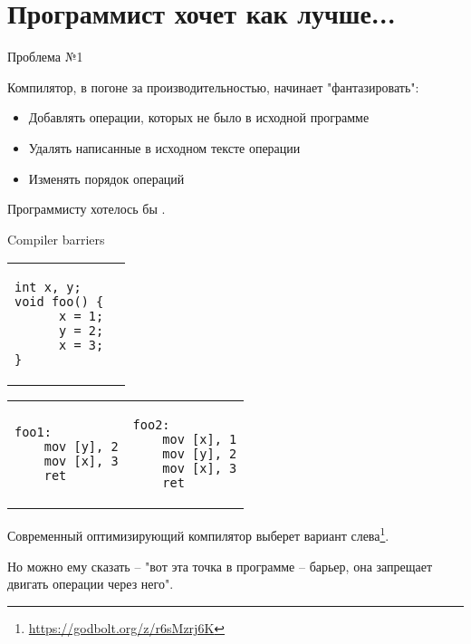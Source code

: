 
\section{Программист хочет как лучше...}
\showTOC

\begin{frame}[t]{Проблема №1}

Компилятор, в погоне за производительностью, начинает "фантазировать":
\begin{itemize}
	\pause
	\item Добавлять операции, которых не было в исходной программе
	\item Удалять написанные в исходном тексте операции
	\item Изменять порядок операций
\end{itemize}

\pause
Программисту хотелось бы .
\pause

\end{frame}

\begin{frame}[t, fragile]{Compiler barriers}

\vspace{-0.5cm}
\begin{tabular}{p{} p{}}
\begin{verbatim}
int x, y;
void foo() {
      x = 1;
      y = 2;
      x = 3;
}
\end{verbatim}
&
\end{tabular}

\vspace{-0.5cm}

\pause

\begin{tabular}{p{} p{}}

\begin{verbatim}
foo1:
    mov [y], 2
    mov [x], 3
    ret
\end{verbatim}

& 

\begin{verbatim}
foo2:
    mov [x], 1
    mov [y], 2
    mov [x], 3
    ret
\end{verbatim}

\end{tabular}

\pause
Современный оптимизирующий компилятор выберет вариант слева\footnote<3->{\tiny\url{https://godbolt.org/z/r6sMzrj6K}}.

\pause
Но можно ему сказать -- "вот эта точка в программе -- барьер, она запрещает двигать операции через него".

\end{frame}



